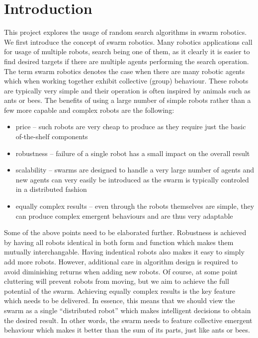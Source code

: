 \section{Introduction}
This project explores the usage of random search algorithms in swarm robotics.
We first introduce the concept of swarm robotics. 
Many robotics applications call for usage of multiple robots, search being one of them, as it
clearly it is easier to find desired targets if there are multiple agents performing the search operation.
The term swarm robotics denotes the case when there are many robotic agents which when working together
exhibit collective (group) behaviour.
These robots are typically very simple and their operation is often inspired by animals such 
as ants or bees.
The benefits of using a large number of simple robots rather than a few more capable and complex robots
are the following:
\begin{itemize}
		\item price -- such robots are very cheap to produce as they require just the basic of-the-shelf components
		\item robustness -- failure of a single robot has a small impact on the overall result
		\item scalability -- swarms are designed to handle a very large number of agents and new agents
				can very easily be introduced as the swarm is typically controled in a distributed fashion
		\item equally complex results 
				-- even through the robots themselves are simple, they can produce complex
				emergent behaviours and are thus very adaptable
\end{itemize}
Some of the above points need to be elaborated further. 
Robustness is achieved by having all robots identical in both form and function which
makes them mutually interchangable. 
Having indentical robots also makes it easy to simply add more robots.
However, additional care in algorithm design is required to avoid diminishing returns
when adding new robots. Of course, at some point cluttering will prevent robots from moving,
but we aim to achieve the full potential of the swarm.
Achieving equally complex results is the key feature which needs to be delivered. 
In essence, this means that we should view the swarm as a single ``distributed robot''
which makes intelligent decisions to obtain the desired result. In other words,
the swarm needs to feature collective emergent behaviour which makes it better
than the sum of its parts, just like ants or bees.

